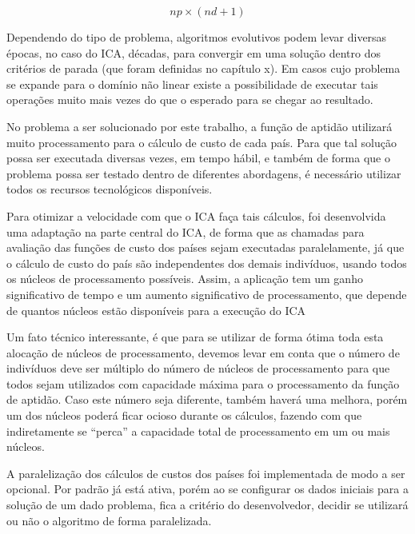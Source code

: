 \begin{equation}
\label{eq:quantidade de chamadas fitness}
np \times (nd + 1)
\end{equation}


Dependendo do tipo de problema, algoritmos evolutivos podem levar diversas épocas, no caso do ICA, décadas, para convergir em uma solução dentro dos critérios de parada (que foram definidas no capítulo x). Em casos cujo problema se expande para o domínio não linear existe a possibilidade de executar tais operações muito mais vezes do que o esperado para se chegar ao resultado. 


No problema a ser solucionado por este trabalho, a função de aptidão utilizará muito processamento para o cálculo de custo de cada país. Para que tal solução possa ser executada diversas vezes, em tempo hábil, e também de forma que o problema possa ser testado dentro de diferentes abordagens, é necessário utilizar todos os recursos tecnológicos disponíveis. 


Para otimizar a velocidade com que o ICA faça tais cálculos, foi desenvolvida uma adaptação na parte central do ICA, de forma que as chamadas para avaliação das funções de custo dos países sejam executadas paralelamente, já que o cálculo de custo do país são independentes dos demais indivíduos, usando todos os núcleos de processamento possíveis. Assim, a aplicação tem um ganho significativo de tempo e um aumento significativo de processamento, que depende de quantos núcleos estão disponíveis para a execução do ICA


Um fato técnico interessante, é que para se utilizar de forma ótima toda esta alocação de núcleos de processamento, devemos levar em conta que o número de indivíduos deve ser múltiplo do número de núcleos de processamento para que todos sejam utilizados com capacidade máxima para o processamento da função de aptidão. Caso este número seja diferente, também haverá uma melhora, porém um dos núcleos poderá ficar ocioso durante os cálculos, fazendo com que indiretamente se “perca” a capacidade total de processamento em um ou mais núcleos. 


A paralelização dos cálculos de custos dos países foi implementada de modo a ser opcional. Por padrão já está ativa, porém ao se configurar os dados iniciais para a solução de um dado problema, fica a critério do desenvolvedor, decidir se utilizará ou não o algoritmo de forma paralelizada.



